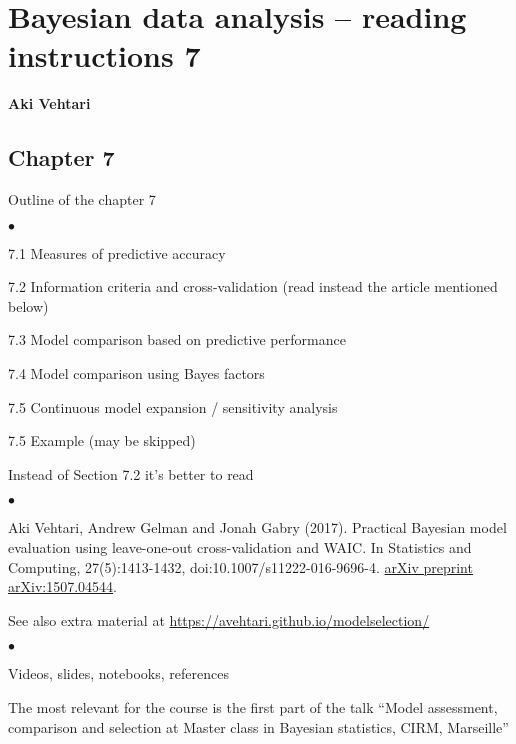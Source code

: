 \documentclass[a4paper,11pt,english]{article}
\begin{document}
\thispagestyle{empty}

\section*{Bayesian data analysis -- reading instructions 7} 
\smallskip
{\bf Aki Vehtari}

\smallskip

\subsection*{Chapter 7}

Outline of the chapter 7
\begin{list}{$\bullet$}{\parsep=0pt\itemsep=2pt}
\item 7.1 Measures of predictive accuracy
\item 7.2 Information criteria and cross-validation (read instead the article mentioned below)
\item 7.3 Model comparison based on predictive performance
\item 7.4 Model comparison using Bayes factors
\item 7.5 Continuous model expansion / sensitivity analysis
\item 7.5 Example (may be skipped)
\end{list}

\noindent
Instead of Section 7.2 it's better to read
\begin{list}{$\bullet$}{\parsep=0pt\itemsep=2pt}
\item Aki Vehtari, Andrew Gelman and Jonah Gabry (2017). Practical
  Bayesian model evaluation using leave-one-out cross-validation and
  WAIC. In Statistics and Computing, 27(5):1413-1432,
  doi:10.1007/s11222-016-9696-4. \href{http://arxiv.org/abs/1507.04544}{arXiv preprint arXiv:1507.04544}.
\end{list}

\noindent
See also  extra material at \url{https://avehtari.github.io/modelselection/}
\begin{list}{$\bullet$}{\parsep=0pt\itemsep=2pt}
\item Videos, slides, notebooks, references
\item The most relevant for the course is the first part of the
  talk ``Model assessment, comparison and selection at Master
  class in Bayesian statistics, CIRM, Marseille''
\end{list}

\end{document}
